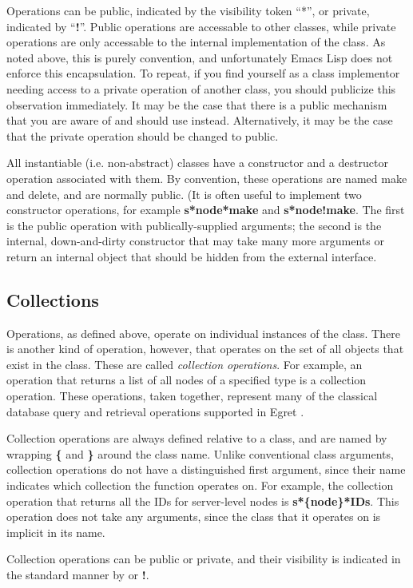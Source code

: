 Operations can be public, indicated by the visibility token ``*'',
or private, indicated by ``{\bf !}''.  Public operations are accessable to
other classes, while private operations are only accessable to the
internal implementation of the class. As noted above, this is purely
convention, and unfortunately Emacs Lisp does not enforce this
encapsulation.  To repeat, if you find yourself as a class implementor
needing access to a private operation of another class, you should
publicize this observation immediately.  It may be the case that there
is a public mechanism that you are aware of and should use instead.
Alternatively, it may be the case that the private operation should be
changed to public.

All instantiable (i.e. non-abstract) classes have a constructor and a
destructor operation associated with them.  By convention, these
operations are named {\sf make} and {\sf delete}, and are normally
public.  (It is often useful to implement two constructor operations,
for example {\bf s*node*make} and {\bf s*node!make}.  The first is the
public operation with publically-supplied arguments; the second is the
internal, down-and-dirty constructor that may take many more arguments
or return an internal object that should be hidden from the external
interface.

\subsection{Collections}

Operations, as defined above, operate on individual instances of the
class. There is another kind of operation, however, that operates on
the set of all objects that exist in the class. These are called {\em
collection operations}.  For example, an operation that returns a list
of all nodes of a specified type is a collection operation.  These
operations, taken together, represent many of the classical database
query and retrieval operations supported in Egret .

Collection operations are always defined relative to a class, and are
named by wrapping {\bf \{} and {\bf \}} around the class name.  Unlike
conventional class arguments, collection operations do not have a
distinguished first argument, since their name indicates which
collection the function operates on.  For example, the collection operation that returns all the
IDs for server-level nodes is {\bf s*\{node\}*IDs}.  This operation
does not take any arguments, since the class that it operates on is
implicit in its name.

Collection operations can be public or private, and their visibility is
indicated in the standard manner by {\bf *} or {\bf !}.






